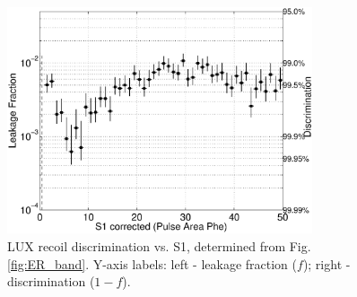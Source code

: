 \begin{figure}[h!]\centering
\includegraphics[width=90mm]{fig/CH3T_Leakage_fid_50_Dec_Tritium_Approval_Plots_2.eps}
\caption{LUX recoil discrimination vs. S1, determined from Fig. \ref{fig:ER_band}. Y-axis labels: left -  leakage fraction ($f$); right - discrimination ($1-f$).}
\label{fig:Leak}
\end{figure}


